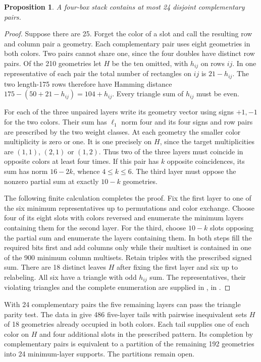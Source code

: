 \documentclass[11pt]{article}
\newtheorem{proposition}[theorem]{Proposition}
\begin{document}
\begin{proposition}\label{p:pairs}
A four-box stack contains at most 24 disjoint complementary pairs.
\end{proposition}
\begin{proof}
Suppose there are 25. Forget the color of a slot and call the resulting row and column pair a geometry. Each complementary pair uses eight geometries in both colors. Two pairs cannot share one, since the four doubles have distinct row pairs. Of the 210 geometries let $H$ be the ten omitted, with $h_{ij}$ on rows $ij$. In one representative of each pair the total number of rectangles on $ij$ is $21-h_{ij}$. The two length-175 rows therefore have Hamming distance $175-(50+21-h_{ij})=104+h_{ij}$. Every triangle sum of $h_{ij}$ must be even.

For each of the three unpaired layers write its geometry vector using signs $+1,-1$ for the two colors. Their sum has $\ell_1$ norm four and its four signs and row pairs are prescribed by the two weight classes. At each geometry the smaller color multiplicity is zero or one. It is one precisely on $H$, since the target multiplicities are $(1,1)$, $(2,1)$ or $(1,2)$. Thus two of the three layers must coincide in opposite colors at least four times. If this pair has $k$ opposite coincidences, its sum has norm $16-2k$, whence $4\le k\le6$. The third layer must oppose the nonzero partial sum at exactly $10-k$ geometries.

The following finite calculation completes the proof. Fix the first layer to one of the six minimum representatives up to permutations and color exchange. Choose four of its eight slots with colors reversed and enumerate the minimum layers containing them for the second layer. For the third, choose $10-k$ slots opposing the partial sum and enumerate the layers containing them. In both steps fill the required bits first and add columns only while their multiset is contained in one of the 900 minimum column multisets. Retain triples with the prescribed signed sum. There are 18 distinct leaves $H$ after fixing the first layer and six up to relabeling. All six have a triangle with odd $h_{ij}$ sum. The representatives, their violating triangles and the complete enumeration are supplied in \cite{data}, in .
\end{proof}

With 24 complementary pairs the five remaining layers can pass the triangle parity test. The data in \cite{data} give 486 five-layer tails with pairwise inequivalent sets $H$ of 18 geometries already occupied in both colors. Each tail supplies one of each color on $H$ and four additional slots in the prescribed pattern. Its completion by complementary pairs is equivalent to a partition of the remaining 192 geometries into 24 minimum-layer supports. The partitions remain open.
\end{document}

